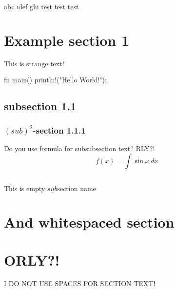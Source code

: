 \begin{epigraph}
    abc \i{def} ghi
    test \b{test} test
\end{epigraph}

\section{Example section 1}
This is strange text!
\begin{code}[lang=rust]
    fn main() {
        println!("Hello World!");
    }
\end{code}

\subsection{subsection 1.1}
\subsubsection{\( {(sub)}^2 \)-section 1.1.1}
Do you use formula for subsubsection text? RLY?!
\begin{equation}
    f(x) = \int \sin x\ dx
\end{equation}

\subsection{}
This is empty \( \underline{sub} \)section name

\section{And whitespaced section}
           
   
       
\section{ORLY?!}
I DO NOT USE SPACES FOR SECTION TEXT!